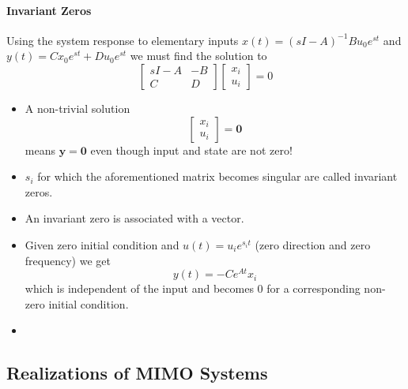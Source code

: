 \paragraph{Invariant Zeros}

Using the system response to elementary inputs $x(t)=(sI-A)^{-1}Bu_0e^{st}$ and $y(t)=Cx_0e^{st}+Du_0e^{st}$ we must find the solution to
\begin{equation*}
    \begin{bmatrix}
        sI-A & -B \\
        C    & D
    \end{bmatrix}
    \begin{bmatrix}
        x_i \\
        u_i
    \end{bmatrix}=0
\end{equation*}



\begin{itemize}
    \item A non-trivial solution
          \begin{equation*}
              \begin{bmatrix}
                  x_i \\
                  u_i
              \end{bmatrix}=\mathbf{0}
          \end{equation*}
          means $\mathbf{y}=\mathbf{0}$ even though input and state are not zero!
    \item $s_i$ for which the aforementioned matrix becomes singular are called invariant zeros.
    \item An invariant zero is associated with a vector.
    \item Given zero initial condition and $u(t)=u_i e^{s_i t}$ (zero direction and zero frequency) we get
          \begin{equation*}
              y(t)=-Ce^{At}x_i
          \end{equation*} which is independent of the input and becomes $0$ for a corresponding non-zero initial condition.
    \item
\end{itemize}


\subsection{Realizations of MIMO Systems}
